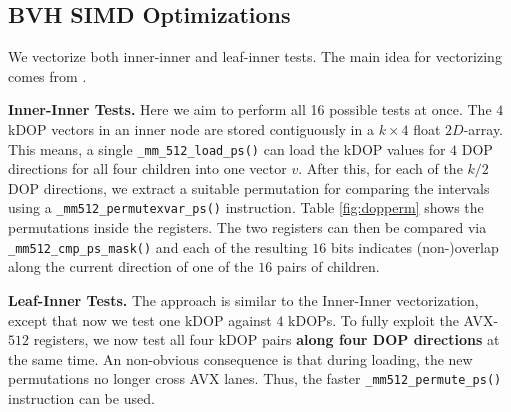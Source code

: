 \documentclass[twocolumn]{article}
\newcommand{\mypar}[1]{{\bf #1.}}
\begin{document}
\subsection{BVH SIMD Optimizations}
We vectorize both inner-inner and leaf-inner tests.
The main idea for vectorizing comes from \cite{simdop}. 

\mypar{Inner-Inner Tests} Here we aim to perform all 16 possible tests at once.
The $4$ kDOP vectors in an inner node are stored contiguously in a $k \times 4$ float $2D$-array.
This means, a single \texttt{\_mm\_512\_load\_ps()} can load the kDOP values for $4$ DOP directions for all four children into one vector $v$.
After this, for each of the $k/2$ DOP directions, we extract a suitable permutation for comparing the intervals using a \texttt{\_mm512\_permutexvar\_ps()}  instruction.
Table \ref{fig:dopperm} shows the permutations 
inside the registers. 
The two registers can then be compared via \texttt{\_mm512\_cmp\_ps\_mask()} and each of the resulting $16$ bits indicates (non-)overlap along the current direction of one of the $16$ pairs of children.

\begin{table}
\begin{center}
\end{center}
\caption{Permutation of the values for the four DOPs $a_1,...,a_4$ of a node $A$ and the four DOPs $b_1,...,b_4$ of a node $B$ to produce a single $512$ Bit AVX register for comparing all $4\times 4$ possible combinations \cite{simdop}.}
\label{fig:dopperm}
\end{table}

\mypar{Leaf-Inner Tests} The approach is similar to the Inner-Inner vectorization, except that now we test one kDOP against $4$ kDOPs. 
To fully exploit the AVX-$512$ registers, we now test all four kDOP pairs \textbf{along four DOP directions} at the same time.
An non-obvious consequence is that during loading, the new permutations no longer cross AVX lanes. 
Thus, the faster \texttt{\_mm512\_permute\_ps()} instruction can be used.
\end{document}

